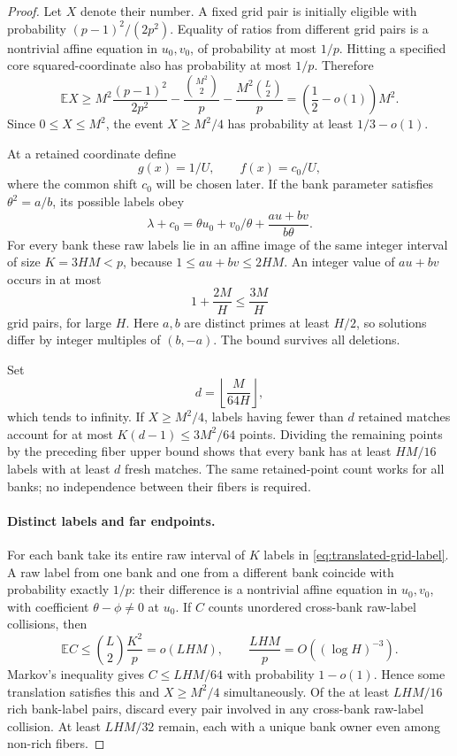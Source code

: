\begin{proof}
Let $X$ denote their number.  A fixed grid pair is initially eligible
with probability $(p-1)^2/(2p^2)$.  Equality of ratios from different
grid pairs is a nontrivial affine equation in $u_0,v_0$, of probability
at most $1/p$.  Hitting a specified core squared-coordinate also has
probability at most $1/p$.  Therefore
\[
 \mathbb E X\ge
 M^2\frac{(p-1)^2}{2p^2}
 -\frac{\binom{M^2}{2}}p
 -\frac{M^2\binom L2}p
 =\left(\frac12-o(1)\right)M^2.
\]
Since $0\le X\le M^2$, the event $X\ge M^2/4$ has probability
at least $1/3-o(1)$.

At a retained coordinate define
\[
 g(x)=1/U,\qquad f(x)=c_0/U,
\]
where the common shift $c_0$ will be chosen later.  If the bank
parameter satisfies $\theta^2=a/b$, its possible labels obey
\begin{equation}\label{eq:translated-grid-label}
 \lambda+c_0
   =\theta u_0+v_0/\theta+\frac{au+bv}{b\theta}.
\end{equation}
For every bank these raw labels lie in an affine image of the same
integer interval of size $K=3HM<p$, because $1\le au+bv\le2HM$.
An integer value of $au+bv$ occurs in at most
\[
 1+\frac{2M}{H}\le\frac{3M}{H}
\]
grid pairs, for large $H$.  Here $a,b$ are distinct primes at least
$H/2$, so solutions differ by integer multiples of $(b,-a)$.
The bound survives all deletions.

Set
\[
 d=\left\lfloor\frac{M}{64H}\right\rfloor,
\]
which tends to infinity.  If $X\ge M^2/4$, labels having fewer than
$d$ retained matches account for at most $K(d-1)\le3M^2/64$ points.
Dividing the remaining points by the preceding fiber upper bound
shows that every bank has at least $HM/16$ labels with at least
$d$ fresh matches.  The same retained-point count works for all
banks; no independence between their fibers is required.

\paragraph{Distinct labels and far endpoints.}
For each bank take its entire raw interval of $K$ labels in
\eqref{eq:translated-grid-label}.  A raw label from one bank and one
from a different bank coincide with probability exactly $1/p$:
their difference is a nontrivial affine equation in $u_0,v_0$, with
coefficient $\theta-\phi\ne0$ at $u_0$.  If $C$ counts unordered
cross-bank raw-label collisions, then
\[
 \mathbb E C\le\binom L2\frac{K^2}{p}=o(LHM),
 \qquad \frac{LHM}{p}=O((\log H)^{-3}).
\]
Markov's inequality gives $C\le LHM/64$ with probability $1-o(1)$.
Hence some translation satisfies this and $X\ge M^2/4$ simultaneously.
Of the at least $LHM/16$ rich bank-label pairs, discard every pair
involved in any cross-bank raw-label collision.  At least $LHM/32$
remain, each with a unique bank owner even among non-rich fibers.


\end{proof}
